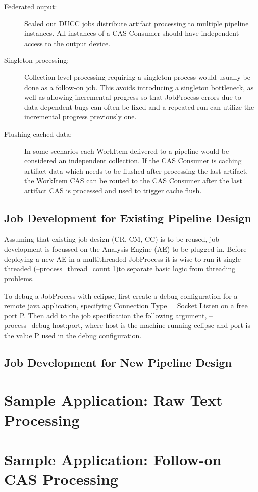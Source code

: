	\begin{description}
	    \item[Federated ouput:] Scaled out DUCC jobs distribute artifact processing
	    to multiple pipeline instances. All instances of a CAS Consumer should have
	    independent access to the output device.
	    \item[Singleton processing:] Collection level processing
	    requiring a singleton process would usually be done as a follow-on job.
	    This avoids introducing a singleton bottleneck, as well as allowing
	    incremental progress so that JobProcess errors due to data-dependent bugs
	    can often be fixed and a repeated run can utilize the incremental progress
	    previously one.
	    \item[Flushing cached data:] In some scenarios each WorkItem delivered to a
	    pipeline would be considered an independent collection. If the CAS Consumer
	    is caching artifact data which needs to be flushed after processing the
	    last artifact, the WorkItem CAS can be routed to the CAS Consumer after
	    the last artifact CAS is processed and used to trigger cache flush.
	\end{description}


\section{Job Development for Existing Pipeline Design}

Assuming that existing job design (CR, CM, CC) is to be reused, job development
is focussed on the Analysis Engine (AE) to be plugged in. Before deploying a new
AE in a multithreaded JobProcess it is wise to run it single threaded
(--process_thread_count 1)to separate basic logic from threading problems.

To debug a JobProcess with eclipse, first create a debug configuration for a
remote java application, specifying Connection Type = Socket Listen on a free
port P. Then add to the job specification the following argument,
--process_debug host:port, where host is the machine running eclipse and port is
the value P used in the debug configuration.

\section{Job Development for New Pipeline Design}


\chapter{Sample Application: Raw Text Processing}
\chapter{Sample Application: Follow-on CAS Processing}
